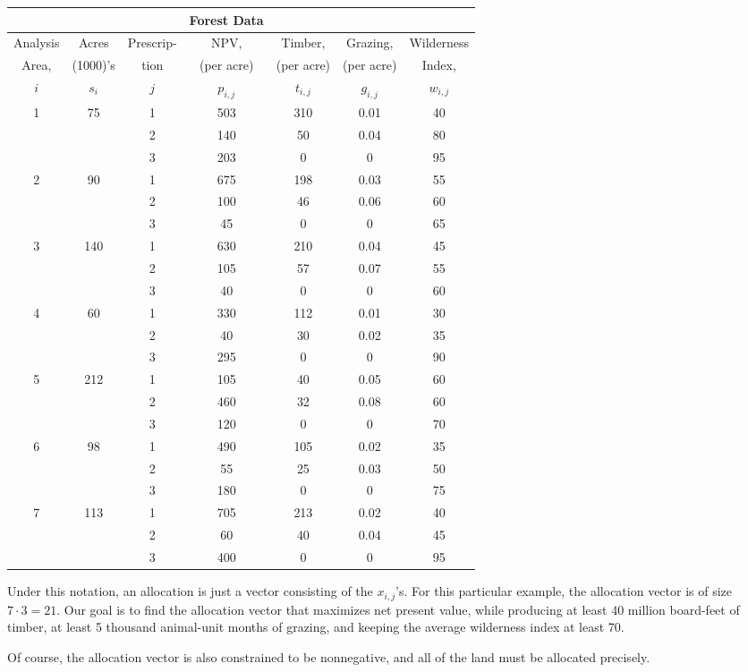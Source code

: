 \begin{table}[h]
\centering
    \begin{tabular}{c c c c c c c}
&&&Forest Data&&& \\
\hline
Analysis & Acres &Prescrip-&NPV,&Timber,&Grazing,&Wilderness \\
Area,&(1000)'s &tion&(per acre) &(per acre)&(per acre)& Index,\\
$i$ &$s_i$&$j$& $p_{i,j}$ & $t_{i,j}$&$g_{i,j}$&$w_{i,j}$ \\\hline
1&	75	&1	&503	&310	&0.01&	40\\
&&		2&	140&	50&	0.04	&80\\
&&		3&	203&	0&	0&	95\\ \hline
2&	90&	1	&675&	198&	0.03&	55\\
&&		2&	100&	46&	0.06&	60\\
&&		3&	45&	0&	0&	65\\ \hline
3&	140&	1	&630&	210	&0.04&	45\\
&&		2&	105&	57&	0.07&	55\\
&&		3&	40	&0&	0&	60\\ \hline
4	&60&	1&	330&	112&	0.01&	30\\
&&		2	&40&	30&	0.02&	35\\
&&		3&	295&	0&	0	&90\\ \hline
5	&212&	1	&105	&40	&0.05&	60\\
&&		2	&460&	32	&0.08&	60\\
&& 3	&120&0&	0	&70\\ \hline
6	&98	&1	&490	&105	&0.02	&35\\
&&		2&	55	&25	&0.03	&50\\
&&		3	&180	&0	&0	&75\\ \hline
7&	113&	1	&705	&213&	0.02	&40\\
&&		2&	60	&40	&0.04&	45\\
&&		3	&400	&0	&0	&95\\
\hline
    \end{tabular}
\label{tab:forest}
\end{table}

Under this notation, an allocation is just a vector consisting of the $x_{i,j}$'s. For this particular
example, the allocation vector is of size $7\cdot 3 = 21$. 
Our goal is to find the allocation vector that maximizes net present value, while producing at least 40 million
board-feet of timber, at least 5 thousand animal-unit months of grazing, and keeping the average wilderness index at least 70.

Of course, the allocation vector is also constrained to be nonnegative, and all of the land must be allocated 
precisely. 

